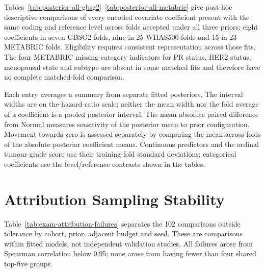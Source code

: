 Tables~\ref{tab:posterior-all-gbsg2}--\ref{tab:posterior-all-metabric} give post-hoc descriptive comparisons of every encoded covariate coefficient present with the same coding and reference level across folds accepted under all three priors: eight coefficients in seven GBSG2 folds, nine in 25 WHAS500 folds and 15 in 23 METABRIC folds. Eligibility requires consistent representation across those fits. The four METABRIC missing-category indicators for PR status, HER2 status, menopausal state and subtype are absent in some matched fits and therefore have no complete matched-fold comparison.

Each entry averages a summary from separate fitted posteriors. The interval widths are on the hazard-ratio scale; neither the mean width nor the fold average of a coefficient is a pooled posterior interval. The mean absolute paired difference from Normal measures sensitivity of the posterior mean to prior configuration. Movement towards zero is assessed separately by comparing the mean across folds of the absolute posterior coefficient means. Continuous predictors and the ordinal tumour-grade score use their training-fold standard deviations; categorical coefficients use the level/reference contrasts shown in the tables.





\section{Attribution Sampling Stability}

Table~\ref{tab:exam-attribution-failures} separates the 102 comparisons outside tolerance by cohort, prior, adjacent budget and seed. These are comparisons within fitted models, not independent validation studies. All failures arose from Spearman correlation below 0.95; none arose from having fewer than four shared top-five groups.



